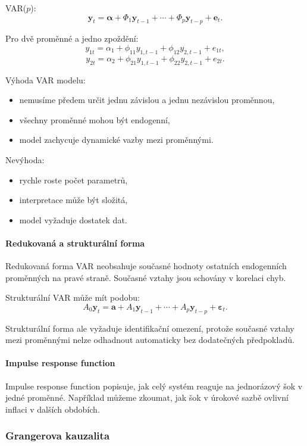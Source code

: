 VAR($p$):
\[
    \mathbf y_t
    =
    \boldsymbol\alpha
    +
    \Phi_1\mathbf y_{t-1}
    +\cdots+
    \Phi_p\mathbf y_{t-p}
    +
    \mathbf e_t.
\]

Pro dvě proměnné a jedno zpoždění:
\[
    y_{1t}=\alpha_1+\phi_{11}y_{1,t-1}+\phi_{12}y_{2,t-1}+e_{1t},
\]
\[
    y_{2t}=\alpha_2+\phi_{21}y_{1,t-1}+\phi_{22}y_{2,t-1}+e_{2t}.
\]

Výhoda VAR modelu:
\begin{itemize}
    \item nemusíme předem určit jednu závislou a jednu nezávislou proměnnou,
    \item všechny proměnné mohou být endogenní,
    \item model zachycuje dynamické vazby mezi proměnnými.
\end{itemize}

Nevýhoda:
\begin{itemize}
    \item rychle roste počet parametrů,
    \item interpretace může být složitá,
    \item model vyžaduje dostatek dat.
\end{itemize}

\paragraph{Redukovaná a strukturální forma}

Redukovaná forma VAR neobsahuje současné hodnoty ostatních endogenních proměnných na pravé straně.
Současné vztahy jsou schovány v korelaci chyb.

Strukturální VAR může mít podobu:
\[
    A_0\mathbf y_t
    =
    \mathbf a
    +
    A_1\mathbf y_{t-1}
    +\cdots+
    A_p\mathbf y_{t-p}
    +
    \boldsymbol\varepsilon_t.
\]

Strukturální forma ale vyžaduje identifikační omezení, protože současné vztahy mezi proměnnými
nelze odhadnout automaticky bez dodatečných předpokladů.

\paragraph{Impulse response function}

Impulse response function popisuje, jak celý systém reaguje na jednorázový šok v jedné proměnné.
Například můžeme zkoumat, jak šok v úrokové sazbě ovlivní inflaci v dalších obdobích.

\subsubsection{Grangerova kauzalita}

